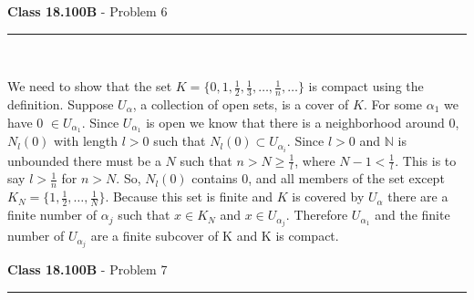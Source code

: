 \documentclass[11pt,reqno]{article}
\begin{document}
\vspace{15pt}
\begin{flushleft} 
\textbf{Class 18.100B} - Problem 6\\
\rule{500pt}{1pt}\\
\end{flushleft} 

We need to show that the set $K = \{ 0,1,\frac{1}{2}, \frac{1}{3}, \ldots, \frac{1}{n}, \ldots \}$ is compact using the definition. Suppose $U_\alpha$, a collection of open sets, is a cover of $K$. For some $\alpha_1$ we have 0 $\in U_{\alpha_1}$. Since $U_{\alpha_1}$ is open we know that there is  a neighborhood around 0, $N_l(0)$ with length $l > 0$ such that $N_l(0) \subset U_{\alpha_i}$. Since $l > 0$ and $\mathbb{N}$ is unbounded there must be a $N$ such that $n > N \ge \frac{1}{l}$, where $N - 1 < \frac{1}{l}$. This is to say $l > \frac{1}{n}$ for $n > N$. So, $N_l(0)$ contains 0, and all members of the set except $K _N = \{1, \frac{1}{2}, \ldots, \frac{1}{N}\}$. Because this set is finite and $K$ is covered by $U_\alpha$ there are a finite number of $\alpha_j$ such that $x \in K_N$ and $x \in U_{\alpha_j}$.  Therefore $U_{\alpha_1}$ and the finite number of $U_{\alpha_j}$ are a finite subcover of K and K is compact.

\vspace{15pt}
\begin{flushleft} 
\textbf{Class 18.100B} - Problem 7\\
\rule{500pt}{1pt}\\
\end{flushleft} 

\end{document}
